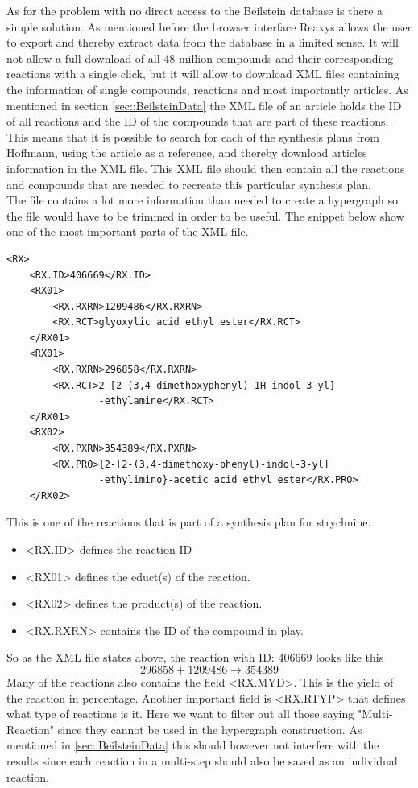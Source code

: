 \documentclass[a4paper,10pt,titlepage]{paper}
\begin{document}
As for the problem with no direct access to the Beilstein database is there a simple solution. As mentioned before the browser interface Reaxys allows the user to export and thereby extract data from the database in a limited sense. It will not allow a full download of all 48 million compounds and their corresponding reactions with a single click, but it will allow to download XML files containing the information of single compounds, reactions and most importantly articles. As mentioned in section \ref{sec::BeilsteinData} the XML file of an article holds the ID of all reactions and the ID of the compounds that are part of these reactions. This means that it is possible to search for each of the synthesis plans from Hoffmann, using the article as a reference, and thereby download articles information in the XML file. This XML file should then contain all the reactions and compounds that are needed to recreate this particular synthesis plan.\\
The file contains a lot more information than needed to create a hypergraph so the file would have to be trimmed in order to be useful. The snippet below show one of the most important parts of the XML file.

\begin{lstlisting}[numbers=none]
<RX>
	<RX.ID>406669</RX.ID>
	<RX01>
		<RX.RXRN>1209486</RX.RXRN>
		<RX.RCT>glyoxylic acid ethyl ester</RX.RCT>
	</RX01>
	<RX01>
		<RX.RXRN>296858</RX.RXRN>
		<RX.RCT>2-[2-(3,4-dimethoxyphenyl)-1H-indol-3-yl]
				-ethylamine</RX.RCT>	
	</RX01>
	<RX02>
		<RX.PXRN>354389</RX.PXRN>
		<RX.PRO>{2-[2-(3,4-dimethoxy-phenyl)-indol-3-yl]
				-ethylimino}-acetic acid ethyl ester</RX.PRO>
	</RX02>
\end{lstlisting}
This is one of the reactions that is part of a synthesis plan for strychnine. 
\begin{itemize}
\item
<RX.ID> defines the reaction ID
\item
<RX01> defines the educt(s) of the reaction.
\item
<RX02> defines the product(s) of the reaction.
\item
<RX.RXRN> contains the ID of the compound in play.
\end{itemize}
So as the XML file states above, the reaction with ID: 406669 looks like this
\begin{equation}
296858 + 1209486 \rightarrow 354389
\end{equation}
Many of the reactions also contains the field <RX.MYD>. This is the yield of the reaction in percentage. Another important field is <RX.RTYP> that defines what type of reactions is it. Here we want to filter out all those saying "Multi-Reaction" since they cannot be used in the hypergraph construction. As mentioned in \ref{sec::BeilsteinData} this should however not interfere with the results since each reaction in a multi-step should also be saved as an individual reaction.\\
\end{document}
